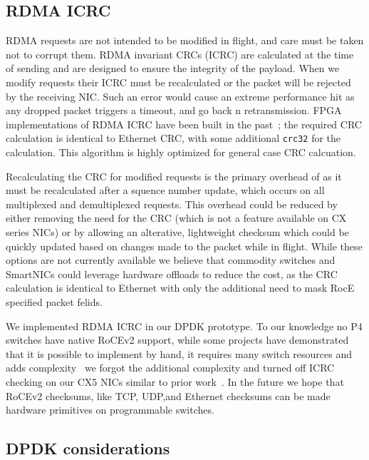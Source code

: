 \subsection{RDMA ICRC}

RDMA requests are not intended to be modified in flight, and care must
be taken not to corrupt them. RDMA invariant CRCs (ICRC) are
calculated at the time of sending and are designed to ensure the
integrity of the payload. When we modify requests their ICRC must be
recalculated or the packet will be rejected by the receiving NIC. Such
an error would cause an extreme performance hit as any dropped packet
triggers a timeout, and go back n retransmission.  FPGA
implementations of RDMA ICRC have been built in the
past~\cite{Mansour_2019}; the required CRC calculation is identical to
Ethernet CRC, with some additional \texttt{crc32} for the
calculation. This algorithm is highly optimized for general case CRC
calcuation.

Recalculating the CRC for modified requests is the primary overhead of {\sword}
as it must be recalculated after a squence number update, which occurs on all
multiplexed and demultiplexed requests. This overhead could be reduced by either
removing the need for the CRC (which is not a feature available on CX series
NICs) or by allowing an alterative, lightweight checksum which could be quickly
updated based on changes made to the packet while in flight. While these options
are not currently available we believe that commodity switches and SmartNICs
could leverage hardware offloads to reduce the cost, as the CRC calculation is
identical to Ethernet with only the additional need to mask RocE specified
packet felids.

We implemented RDMA ICRC in our DPDK prototype. To our knowledge no P4 switches
have native RoCEv2 support, while some projects have demonstrated that it is
possible to implement by hand, it requires many switch resources and adds
complexity~\cite{p4-telem} we forgot the additional complexity and turned off
ICRC checking on our CX5 NICs similar to prior work~\cite{switchml}. In the
future we hope that RoCEv2 checksums, like TCP, UDP,and Ethernet checksums can
be made hardware primitives on programmable switches.

\subsection{DPDK considerations}

